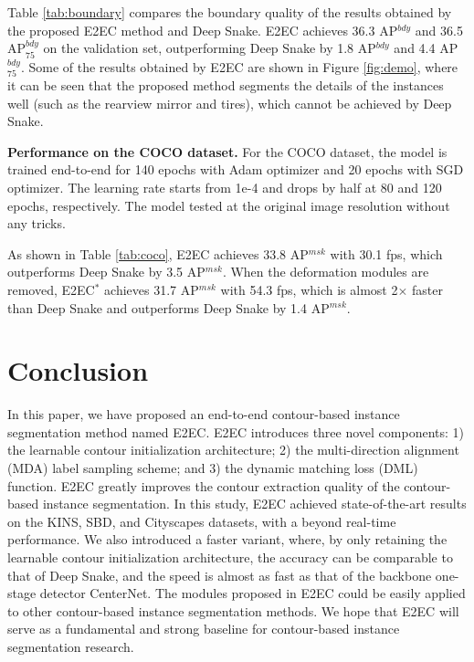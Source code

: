 \documentclass[10pt,twocolumn,letterpaper]{article}
\begin{document}
Table \ref{tab:boundary} compares the boundary quality of the results obtained by the proposed E2EC method and Deep Snake. E2EC achieves 36.3 AP$^{bdy}$ and 36.5 AP$_{75}^{bdy}$ on the validation set, outperforming Deep Snake by 1.8 AP$^{bdy}$ and 4.4 AP$_{75}^{bdy}$. Some of the results obtained by E2EC are shown in Figure \ref{fig:demo}, where it can be seen that the proposed method segments the details of the instances well (such as the rearview mirror and tires), which cannot be achieved by Deep Snake.

\textbf{Performance on the COCO dataset.} For the COCO dataset, the model is trained end-to-end for 140 epochs with Adam optimizer and 20 epochs with SGD optimizer. The learning rate starts from 1e-4 and drops by half at 80 and 120 epochs, respectively. The model tested at the original image resolution without any tricks.

As shown in Table \ref{tab:coco}, E2EC achieves 33.8 AP$^{msk}$ with 30.1 fps, which outperforms Deep Snake by 3.5 AP$^{msk}$. When the deformation modules are removed, E2EC$^{*}$ achieves 31.7 AP$^{msk}$ with 54.3 fps, which is almost 2$\times$ faster than Deep Snake and outperforms Deep Snake by 1.4 AP$^{msk}$. 
\vspace{-3mm}\section{Conclusion}\vspace{-2mm}
\label{sec:conclusion}
In this paper, we have proposed an end-to-end contour-based instance segmentation method named E2EC. E2EC introduces three novel components: 1) the learnable contour initialization architecture; 2) the multi-direction alignment (MDA) label sampling scheme; and 3) the  dynamic matching loss (DML) function. E2EC greatly improves the contour extraction quality of the contour-based instance segmentation. In this study, E2EC achieved state-of-the-art results on the KINS, SBD, and Cityscapes datasets, with a beyond real-time performance. We also introduced a faster variant, where, by only retaining the learnable contour initialization architecture, the accuracy can be comparable to that of Deep Snake, and the speed is almost as fast as that of the backbone one-stage detector CenterNet. The modules proposed in E2EC could be easily applied to other contour-based instance segmentation methods. We hope that E2EC will serve as a fundamental and strong baseline for contour-based instance segmentation research.
{\small\vspace{-9mm}


}
\end{document}
